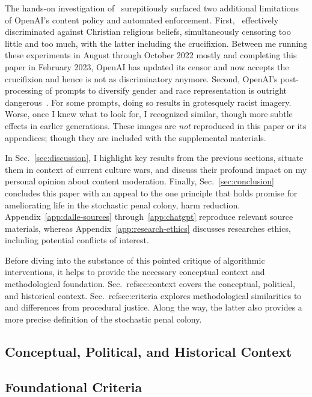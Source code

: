 The hands-on investigation of \DALLE\ surepitiously surfaced two additional
limitations of OpenAI's content policy and automated enforcement. First, \DALLE\
effectively discriminated against Christian religious beliefs, simultaneously
censoring too little and too much, with the latter including the crucifixion.
Between me running these experiments in August through October 2022 mostly and
completing this paper in February 2023, OpenAI has updated its censor and now
accepts the crucifixion and hence is not as discriminatory anymore. Second,
OpenAI's post-processing of prompts to diversify gender and race representation
is outright dangerous~\cite{OpenAI2022e,Sparkes2022}. For some prompts, doing so
results in grotesquely racist imagery. Worse, once I knew what to look for, I
recognized similar, though more subtle effects in earlier generations. These
images are \emph{not} reproduced in this paper or its appendices; though they
are included with the supplemental materials.

In Sec.\ \ref{sec:discussion}, I highlight key results from the previous
sections, situate them in context of current culture wars, and discuss their
profound impact on my personal opinion about content moderation. Finally, Sec.\
\ref{sec:conclusion} concludes this paper with an appeal to the one principle
that holds promise for ameliorating life in the stochastic penal colony, harm
reduction. Appendix~\ref{app:dalle-sources} through~\ref{app:chatgpt} reproduce
relevant source materials, whereas Appendix~\ref{app:research-ethics} discusses
researches ethics, including potential conflicts of interest.

Before diving into the substance of this pointed critique of algorithmic
interventions, it helps to provide the necessary conceptual context and
methodological foundation. Sec.\ ref{sec:context} covers the conceptual,
political, and historical context. Sec.\ ref{sec:criteria} explores
methodological similarities to and differences from procedural justice. Along
the way, the latter also provides a more precise definition of the stochastic
penal colony.


\subsection{Conceptual, Political, and Historical Context}
\label{sec:context}




\subsection{Foundational Criteria}
\label{sec:criteria}

